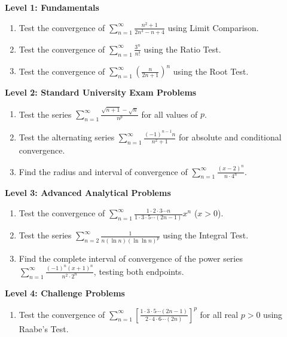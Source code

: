 \begin{practiceset}
\noindent\textbf{Level 1: Fundamentals}
\begin{enumerate}[leftmargin=1.5em]
    \item Test the convergence of $\sum_{n=1}^\infty \frac{n^2 + 1}{2n^3 - n + 4}$ using Limit Comparison.
    \item Test the convergence of $\sum_{n=1}^\infty \frac{3^n}{n!}$ using the Ratio Test.
    \item Test the convergence of $\sum_{n=1}^\infty \left(\frac{n}{2n+1}\right)^n$ using the Root Test.
\end{enumerate}

\medskip
\noindent\textbf{Level 2: Standard University Exam Problems}
\begin{enumerate}[leftmargin=1.5em, start=4]
    \item Test the series $\sum_{n=1}^\infty \frac{\sqrt{n+1}-\sqrt{n}}{n^p}$ for all values of $p$.
    \item Test the alternating series $\sum_{n=1}^\infty \frac{(-1)^{n-1} n}{n^2 + 1}$ for absolute and conditional convergence.
    \item Find the radius and interval of convergence of $\sum_{n=1}^\infty \frac{(x-2)^n}{n \cdot 4^n}$.
\end{enumerate}

\medskip
\noindent\textbf{Level 3: Advanced Analytical Problems}
\begin{enumerate}[leftmargin=1.5em, start=7]
    \item Test the convergence of $\sum_{n=1}^\infty \frac{1 \cdot 2 \cdot 3 \cdots n}{1 \cdot 3 \cdot 5 \cdots (2n-1)} x^n$ ($x > 0$).
    \item Test the series $\sum_{n=2}^\infty \frac{1}{n (\ln n)(\ln \ln n)^p}$ using the Integral Test.
    \item Find the complete interval of convergence of the power series $\sum_{n=1}^\infty \frac{(-1)^n (x+1)^n}{n^2 \cdot 2^n}$, testing both endpoints.
\end{enumerate}

\medskip
\noindent\textbf{Level 4: Challenge Problems}
\begin{enumerate}[leftmargin=1.5em, start=10]
    \item Test the convergence of $\sum_{n=1}^\infty \left[ \frac{1 \cdot 3 \cdot 5 \cdots (2n-1)}{2 \cdot 4 \cdot 6 \cdots (2n)} \right]^p$ for all real $p > 0$ using Raabe's Test.
\end{enumerate}
\end{practiceset}

